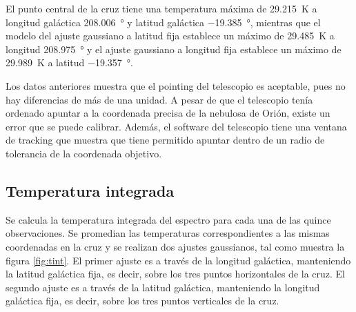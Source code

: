 El punto central de la cruz tiene una temperatura máxima de \SI{29.215}{\kelvin} a longitud galáctica \SI{208.006}{\degree} y latitud galáctica \SI{-19.385}{\degree}, mientras que el modelo del ajuste gaussiano a latitud fija establece un máximo de \SI{29.485}{\kelvin} a longitud \SI{208.975}{\degree} y el ajuste gaussiano a longitud fija establece un máximo de \SI{29.989}{\kelvin} a latitud \SI{-19.357}{\degree}.

Los datos anteriores muestra que el pointing del telescopio es aceptable, pues no hay diferencias de más de una unidad. A pesar de que el telescopio tenía ordenado apuntar a la coordenada precisa de la nebulosa de Orión, existe un error que se puede calibrar. Además, el software del telescopio tiene una ventana de tracking que muestra que tiene permitido apuntar dentro de un radio de tolerancia de la coordenada objetivo.

\subsection{Temperatura integrada}

Se calcula la temperatura integrada del espectro para cada una de las quince observaciones. Se promedian las temperaturas correspondientes a las mismas coordenadas en la cruz y se realizan dos ajustes gaussianos, tal como muestra la figura \ref{fig:tint}. El primer ajuste es a través de la longitud galáctica, manteniendo la latitud galáctica fija, es decir, sobre los tres puntos horizontales de la cruz. El segundo ajuste es a través de la latitud galáctica, manteniendo la longitud galáctica fija, es decir, sobre los tres puntos verticales de la cruz.

